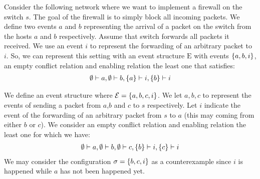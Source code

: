 \begin{example}
    Consider the following network where we want to implement a firewall
    on the switch $s$.
    The goal of the firewall is to simply block all incoming packets.
    We define two events $a$ and $b$ representing the arrival of a packet
    on the switch from the hosts $a$ and $b$ respectively.
    Assume that switch forwards all packets it received.
    We use an event $i$ to represent the forwarding of an arbitrary packet
    to $i$.
    So, we can represent this setting with an event structure $\mathrm{E}$
    with events $\{a,b,i\}$, an empty conflict relation and enabling relation
    the least one that satisfies:
    \begin{align*}
        \emptyset \vdash a, \emptyset \vdash b, \{a\} \vdash i, \{b\} \vdash i
    \end{align*}
    
    \begin{center}
    \end{center}
    We define an event structure where
    $\mathcal{E} = \{a,b,c,i\}$.
    We let $a,b,c$ to represent the events of sending
    a packet from $a$,$b$ and $c$ to $s$ respectively.
    Let $i$ indicate the event of the forwarding of
    an arbitrary packet from $s$ to $a$ (this may coming
    from either $b$ or $c$).
    We consider an empty conflict relation and enabling
    relation the least one for which we have:
    \begin{align*}
        \emptyset \vdash a,\emptyset \vdash b, \emptyset \vdash c,
        \{b\} \vdash i, \{c\} \vdash i
    \end{align*}
    We may consider the configuration $\sigma = \{b,c,i\}$ as a
    counterexample since $i$ is happened while $a$ has not been happened yet.
\end{example}